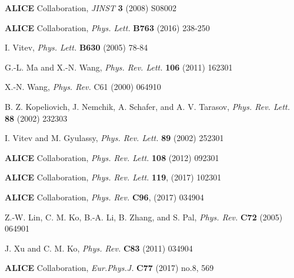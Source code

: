 \documentclass{PoS}
\begin{document}
\FloatBarrier


\begin{thebibliography}{99}

  {\bf ALICE} Collaboration,
  \emph{JINST} {\bf 3} (2008) S08002

  {\bf ALICE} Collaboration,
  \emph{Phys. Lett.} {\bf B763} (2016) 238-250

  I. Vitev,
  \emph{Phys. Lett.} {\bf B630} (2005) 78-84

  G.-L. Ma and X.-N. Wang, 
  \emph{Phys. Rev. Lett.} {\bf 106} (2011) 162301

  X.-N. Wang,
  \emph{Phys. Rev.} C61 (2000) 064910

  B. Z. Kopeliovich, J. Nemchik, A. Schafer, and A. V. Tarasov,
  \emph{Phys. Rev. Lett.} {\bf 88} (2002) 232303

  I. Vitev and M. Gyulassy,
  \emph{Phys. Rev. Lett.} {\bf 89} (2002) 252301

  {\bf ALICE} Collaboration,  
  \emph{Phys. Rev. Lett.} {\bf 108} (2012) 092301

  {\bf ALICE} Collaboration,
  \emph{Phys. Rev. Lett.} {\bf 119}, (2017) 102301

  {\bf ALICE} Collaboration,
  \emph{Phys. Rev.} {\bf C96}, (2017) 034904 

  Z.-W. Lin, C. M. Ko, B.-A. Li, B. Zhang, and S. Pal,
  \emph{Phys. Rev.} {\bf C72} (2005) 064901

  J. Xu and C. M. Ko,
    \emph{Phys. Rev.} {\bf C83} (2011) 034904

  {\bf ALICE} Collaboration, 
  \emph{Eur.Phys.J.} {\bf C77} (2017) no.8, 569 


\end{thebibliography}
\end{document}
